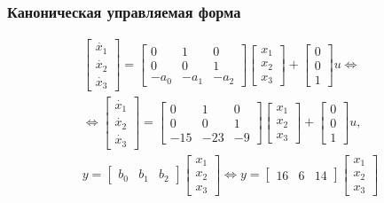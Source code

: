 \documentclass[a5paper, 10pt]{article}
\theoremstyle{definition}
\theoremstyle{plain}
\theoremstyle{remark}
\begin{document}
\subsubsection{Каноническая управляемая форма}

\begin{multline}
\begin{bmatrix}
\dot{x_1}\\
\dot{x_2}\\
\dot{x_3}
\end{bmatrix}
=
\begin{bmatrix}
0 & 1 & 0\\
0 & 0 & 1\\
-a_0 & -a_1 & -a_2
\end{bmatrix}
\begin{bmatrix}
x_1\\
x_2\\
x_3
\end{bmatrix}
+
\begin{bmatrix}
0\\
0\\
1
\end{bmatrix}
u \Leftrightarrow\\
\Leftrightarrow
\begin{bmatrix}
\dot{x_1}\\
\dot{x_2}\\
\dot{x_3}
\end{bmatrix}
=
\begin{bmatrix}
0 & 1 & 0\\
0 & 0 & 1\\
-15 & -23 & -9
\end{bmatrix}
\begin{bmatrix}
x_1\\
x_2\\
x_3
\end{bmatrix}
+
\begin{bmatrix}
0\\
0\\
1
\end{bmatrix}
u,\\
 y = 
\begin{bmatrix}
b_0 & b_1 & b_2
\end{bmatrix}
\begin{bmatrix}
x_1\\
x_2\\
x_3
\end{bmatrix}\Leftrightarrow
 y = 
\begin{bmatrix}
16 & 6 & 14
\end{bmatrix}
\begin{bmatrix}
x_1\\
x_2\\
x_3
\end{bmatrix}
\end{multline}
\end{document}
